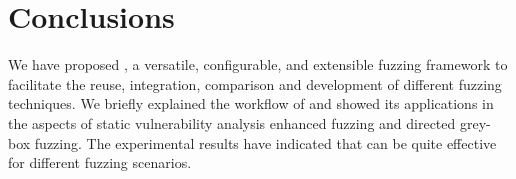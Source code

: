 \begin{table}[t]
	\small
	\caption{Comparisons between Different Fuzzers (\Circle: not supported, \LEFTcircle: partially supported, \CIRCLE: fully supported)}
	\label{tbl:cmp_fuzz}
	\vspace{-10pt}
\end{table}
 

\section{Conclusions}

We have proposed {\FOT}, a versatile, configurable, and extensible fuzzing framework to facilitate the reuse, integration, comparison and development of different fuzzing techniques. We briefly explained the workflow of {\FOT} and showed its applications in the aspects of static vulnerability analysis enhanced fuzzing and directed grey-box fuzzing. The experimental results have indicated that {\FOT} can be quite effective for different fuzzing scenarios.


